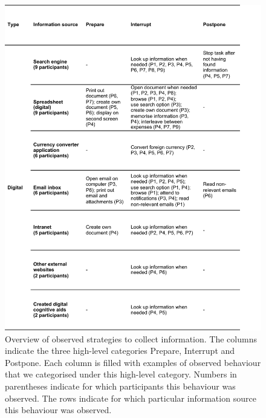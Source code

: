 \begin{figure}
\centering
\includegraphics[scale=0.8]{images/ch12/ch12_TableDig.pdf}
\caption{Overview of observed strategies to collect information. The columns indicate the three high-level categories Prepare, Interrupt and Postpone. Each column is filled with examples of observed behaviour that we categorised under this high-level category. Numbers in parentheses indicate for which participants this behaviour was observed. The rows indicate for which particular information source this behaviour was observed.}
\label{tbl:ch12_Table2}
\end{figure}

